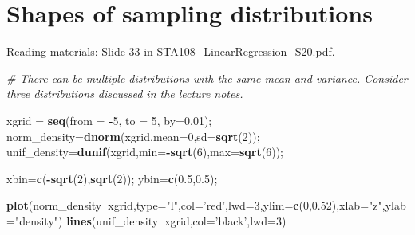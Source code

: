 \documentclass[12pt,]{book}
\newenvironment{Shaded}{\begin{snugshade}}{\end{snugshade}}
\newcommand{\KeywordTok}[1]{\textcolor[rgb]{0.13,0.29,0.53}{\textbf{#1}}}
\newcommand{\DataTypeTok}[1]{\textcolor[rgb]{0.13,0.29,0.53}{#1}}
\newcommand{\DecValTok}[1]{\textcolor[rgb]{0.00,0.00,0.81}{#1}}
\newcommand{\FloatTok}[1]{\textcolor[rgb]{0.00,0.00,0.81}{#1}}
\newcommand{\StringTok}[1]{\textcolor[rgb]{0.31,0.60,0.02}{#1}}
\newcommand{\CommentTok}[1]{\textcolor[rgb]{0.56,0.35,0.01}{\textit{#1}}}
\newcommand{\OperatorTok}[1]{\textcolor[rgb]{0.81,0.36,0.00}{\textbf{#1}}}
\newcommand{\NormalTok}[1]{#1}
\begin{document}
\section{Shapes of sampling
distributions}\label{shapes-of-sampling-distributions}

Reading materials: Slide 33 in STA108\_LinearRegression\_S20.pdf.

\begin{Shaded}
\begin{Highlighting}[]
\CommentTok{# There can be multiple distributions with the same mean and variance. Consider three distributions discussed in the lecture notes.}

\NormalTok{xgrid =}\StringTok{ }\KeywordTok{seq}\NormalTok{(}\DataTypeTok{from =} \OperatorTok{-}\DecValTok{5}\NormalTok{, }\DataTypeTok{to =} \DecValTok{5}\NormalTok{, }\DataTypeTok{by=}\FloatTok{0.01}\NormalTok{);}
\NormalTok{norm_density=}\KeywordTok{dnorm}\NormalTok{(xgrid,}\DataTypeTok{mean=}\DecValTok{0}\NormalTok{,}\DataTypeTok{sd=}\KeywordTok{sqrt}\NormalTok{(}\DecValTok{2}\NormalTok{));}
\NormalTok{unif_density=}\KeywordTok{dunif}\NormalTok{(xgrid,}\DataTypeTok{min=}\OperatorTok{-}\KeywordTok{sqrt}\NormalTok{(}\DecValTok{6}\NormalTok{),}\DataTypeTok{max=}\KeywordTok{sqrt}\NormalTok{(}\DecValTok{6}\NormalTok{));}

\NormalTok{xbin=}\KeywordTok{c}\NormalTok{(}\OperatorTok{-}\KeywordTok{sqrt}\NormalTok{(}\DecValTok{2}\NormalTok{),}\KeywordTok{sqrt}\NormalTok{(}\DecValTok{2}\NormalTok{));}
\NormalTok{ybin=}\KeywordTok{c}\NormalTok{(}\FloatTok{0.5}\NormalTok{,}\FloatTok{0.5}\NormalTok{);}


\KeywordTok{plot}\NormalTok{(norm_density}\OperatorTok{~}\NormalTok{xgrid,}\DataTypeTok{type=}\StringTok{"l"}\NormalTok{,}\DataTypeTok{col=}\StringTok{'red'}\NormalTok{,}\DataTypeTok{lwd=}\DecValTok{3}\NormalTok{,}\DataTypeTok{ylim=}\KeywordTok{c}\NormalTok{(}\DecValTok{0}\NormalTok{,}\FloatTok{0.52}\NormalTok{),}\DataTypeTok{xlab=}\StringTok{"z"}\NormalTok{,}\DataTypeTok{ylab=}\StringTok{"density"}\NormalTok{)}
\KeywordTok{lines}\NormalTok{(unif_density}\OperatorTok{~}\NormalTok{xgrid,}\DataTypeTok{col=}\StringTok{'black'}\NormalTok{,}\DataTypeTok{lwd=}\DecValTok{3}\NormalTok{)}


\end{Highlighting}
\end{Shaded}
\end{document}

